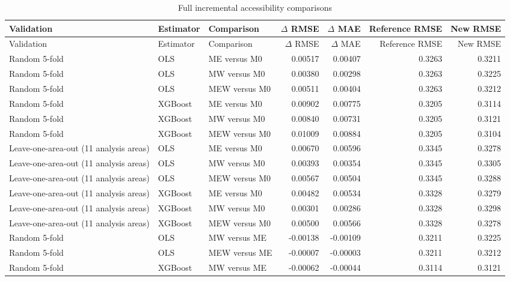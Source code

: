 \begin{landscape}
\small
\begin{longtable}{>{\raggedright\arraybackslash}p{4cm}>{\raggedright\arraybackslash}p{2.6cm}>{\raggedright\arraybackslash}p{3.8cm}rrrr}
\caption{Full incremental accessibility comparisons}\label{tab:app-incremental-full}\\
\toprule
Validation & Estimator & Comparison & $\Delta$ RMSE & $\Delta$ MAE & Reference RMSE & New RMSE \\
\midrule
\endfirsthead
\toprule
Validation & Estimator & Comparison & $\Delta$ RMSE & $\Delta$ MAE & Reference RMSE & New RMSE \\
\midrule
\endhead
Random 5-fold & OLS & ME versus M0 & 0.00517 & 0.00407 & 0.3263 & 0.3211 \\
Random 5-fold & OLS & MW versus M0 & 0.00380 & 0.00298 & 0.3263 & 0.3225 \\
Random 5-fold & OLS & MEW versus M0 & 0.00511 & 0.00404 & 0.3263 & 0.3212 \\
Random 5-fold & XGBoost & ME versus M0 & 0.00902 & 0.00775 & 0.3205 & 0.3114 \\
Random 5-fold & XGBoost & MW versus M0 & 0.00840 & 0.00731 & 0.3205 & 0.3121 \\
Random 5-fold & XGBoost & MEW versus M0 & 0.01009 & 0.00884 & 0.3205 & 0.3104 \\
Leave-one-area-out (11 analysis areas) & OLS & ME versus M0 & 0.00670 & 0.00596 & 0.3345 & 0.3278 \\
Leave-one-area-out (11 analysis areas) & OLS & MW versus M0 & 0.00393 & 0.00354 & 0.3345 & 0.3305 \\
Leave-one-area-out (11 analysis areas) & OLS & MEW versus M0 & 0.00567 & 0.00504 & 0.3345 & 0.3288 \\
Leave-one-area-out (11 analysis areas) & XGBoost & ME versus M0 & 0.00482 & 0.00534 & 0.3328 & 0.3279 \\
Leave-one-area-out (11 analysis areas) & XGBoost & MW versus M0 & 0.00301 & 0.00286 & 0.3328 & 0.3298 \\
Leave-one-area-out (11 analysis areas) & XGBoost & MEW versus M0 & 0.00500 & 0.00566 & 0.3328 & 0.3278 \\
Random 5-fold & OLS & MW versus ME & -0.00138 & -0.00109 & 0.3211 & 0.3225 \\
Random 5-fold & OLS & MEW versus ME & -0.00007 & -0.00003 & 0.3211 & 0.3212 \\
Random 5-fold & XGBoost & MW versus ME & -0.00062 & -0.00044 & 0.3114 & 0.3121 \\

\end{longtable}
\end{landscape}

